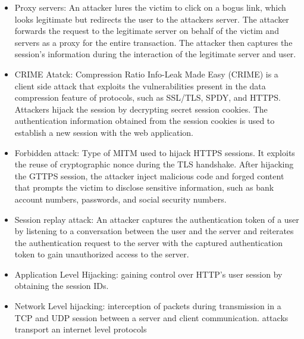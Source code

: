 \begin{itemize}
    \item Proxy servers: An attacker lures the victim to click on a bogus link, which looks legitimate but redirects the user to the attackers server. The attacker forwards the request to the legitimate server on behalf of the victim and servers as a proxy for the entire transaction. The attacker then captures the session's information during the interaction of the legitimate server and user.
    \item CRIME Atatck: Compression Ratio Info-Leak Made Easy (CRIME) is a client side attack that exploits the vulnerabilities present in the data compression feature of protocols, such as SSL/TLS, SPDY, and HTTPS. Attackers hijack the session by decrypting secret session cookies. The authentication information obtained from the session cookies is used to establish a new session with the web application.
    \item Forbidden attack: Type of MITM used to hijack HTTPS sessions. It exploits the reuse of cryptographic nonce during the TLS handshake. After hijacking the GTTPS session, the attacker inject malicious code and forged content that prompts the victim to disclose sensitive information, such as bank account numbers, passwords, and social security numbers.
    \item Session replay attack: An attacker captures the authentication token of a user by listening to a conversation between the user and the server and reiterates the authentication request to the server with the captured authentication token to gain unauthorized access to the server.
    \item Application Level Hijacking: gaining control over HTTP's user session by obtaining the session IDs.
    \item Network Level hijacking: interception of packets during transmission in a TCP and UDP session between a server and client communication. attacks transport an internet level protocols
\end{itemize}

